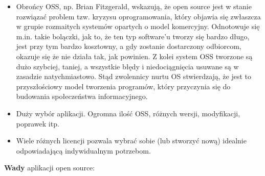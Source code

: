 \documentclass{article}
\begin{document}
\begin{itemize}
    \item Obrońcy OSS, np. Brian Fitzgerald, wskazują, że open source jest w stanie rozwiązać problem tzw. kryzysu oprogramowania, który objawia się zwłaszcza w grupie rozmaitych systemów opartych o model komercyjny. Odnotowuje się m.in. takie bolączki, jak to, że ten typ software'u tworzy się bardzo długo, jest przy tym bardzo kosztowny, a gdy zostanie dostarczony odbiorcom, okazuje się że nie działa tak, jak powinien. Z kolei system OSS tworzone są dużo szybciej, taniej, a wszystkie błędy i niedociągnięcia usuwane są w zasadzie natychmiastowo. Stąd zwolennicy nurtu OS stwierdzają, że jest to przyszłościowy model tworzenia programów, który przyczynia się do budowania społeczeństwa informacyjnego\cite{Kotula}.
    
    \item Duży wybór aplikacji. Ogromna ilość OSS, różnych wersji, modyfikacji, poprawek itp\cite{Kotula}.
    
    \item Wiele różnych licencji pozwala wybrać sobie (lub stworzyć nową) idealnie odpowiadającą indywidualnym potrzebom\cite{Kotula}. 
\end{itemize}

\textbf{Wady} aplikacji open source:
\end{document}
